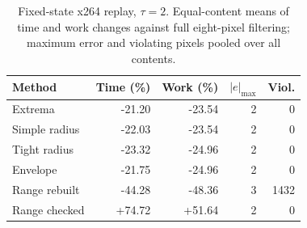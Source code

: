 \begin{table}[t]\centering
\caption{Fixed-state x264 replay, $\tau=2$. Equal-content means of time and work changes against full eight-pixel filtering; maximum error and violating pixels pooled over all contents.}\label{tab:kernel}
\setlength{\tabcolsep}{3pt}
\begin{tabular}{lrrrr}\toprule
Method & Time (\%) & Work (\%) & $|e|_{\max}$ & Viol.\\\midrule
Extrema & -21.20 & -23.54 & 2 & 0\\
Simple radius & -22.03 & -23.54 & 2 & 0\\
Tight radius & -23.32 & -24.96 & 2 & 0\\
Envelope & -21.75 & -24.96 & 2 & 0\\
Range rebuilt & -44.28 & -48.36 & 3 & 1432\\
Range checked & +74.72 & +51.64 & 2 & 0\\
\bottomrule\end{tabular}
\end{table}
